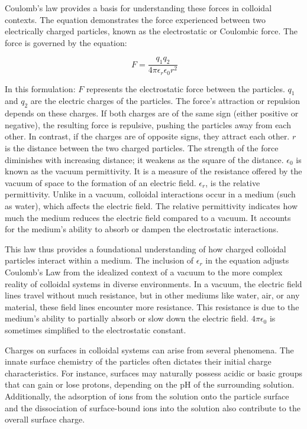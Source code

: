 Coulomb's law provides a basis for understanding these forces in colloidal contexts. The equation demonstrates the force experienced between two electrically charged particles, known as the electrostatic or Coulombic force. The force is governed by the
equation:

\begin{equation}
\
F = \frac{q_1q_2}{4 \pi \epsilon_r \epsilon_0 r^2}
\end{equation}

In this formulation:
$F$ represents the electrostatic force between the particles.
$q_1$ and $q_2$ are the electric charges of the particles. The force's attraction or repulsion depends on these charges. If both charges are of the same sign (either positive or negative), the resulting force is repulsive, pushing the particles away from each other. In contrast, if the charges are of opposite signs, they attract each other.
$r$ is the distance between the two charged particles. The strength of the force diminishes with increasing distance; it weakens as the square of the distance.
$\epsilon_0$ is known as the vacuum permittivity. It is a measure of the resistance offered by the vacuum of space to the formation of an electric field.
$\epsilon_r$, is the relative permittivity. Unlike in a vacuum, colloidal interactions occur in a medium (such as water), which affects the electric field. The relative permittivity indicates how much the medium reduces the electric field compared to a vacuum. It accounts for the medium's ability to absorb or dampen the electrostatic interactions.

This law thus provides a foundational understanding of how charged colloidal particles interact within a medium. The inclusion of $\epsilon_r$ in the equation adjusts Coulomb's Law from the idealized context of a vacuum to the more complex reality of colloidal systems in diverse environments. In a vacuum, the electric field lines travel without much resistance, but in other mediums like water, air, or any material, these field lines encounter more resistance. This resistance is due to the medium's ability to partially absorb or slow down the electric field. $4\pi \epsilon_0$ is sometimes simplified to the electrostatic constant. 

Charges on surfaces in colloidal systems can arise from several phenomena. The innate surface chemistry of the particles often dictates their initial charge characteristics. For instance, surfaces may naturally possess acidic or basic groups that can gain or lose protons, depending on the pH of the surrounding solution. Additionally, the adsorption of ions from the solution onto the particle surface and the dissociation of surface-bound ions into the solution also contribute to the overall surface charge.

